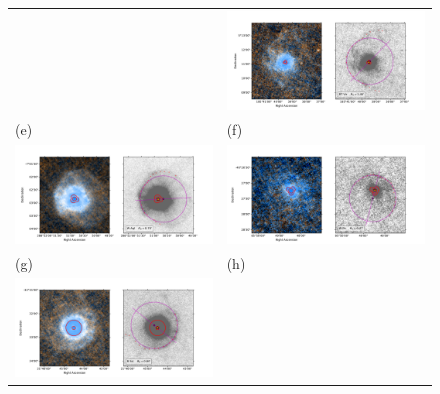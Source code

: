 \documentclass[useAMS, usenatbib, a4paper]{mnras}
\begin{document}
\begin{figure}
\begin{tabular}{ll}
    & \includegraphics[trim=10 0 65 20, clip]{figs/rtvir-imageplot} \\
    (e) & (f) \\
    \includegraphics[trim=10 0 65 20, clip]{figs/waql-imageplot}
    & \includegraphics[trim=10 0 65 20, clip]{figs/wpic-imageplot} \\
    (g) & (h) \\
    \includegraphics[trim=10 0 65 20, clip]{figs/rscl-imageplot}

\end{tabular}
\end{figure}
\end{document}
